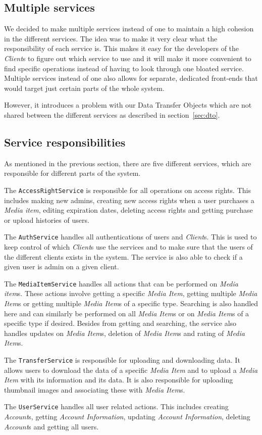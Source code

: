 \documentclass[../report.tex]{subfiles}
\begin{document}
\subsection{Multiple services}
We decided to make multiple services instead of one to maintain a high cohesion in the different services.
The idea was to make it very clear what the responsibility of each service is. 
This makes it easy for the developers of the \textit{Client}s to figure out which service to use and it will make it more convenient to find specific operations instead of having to look through one bloated service.
Multiple services instead of one also allows for separate, dedicated front-ends that would target just certain parts of the whole system. 

However, it introduces a problem with our Data Transfer Objects which are not shared between the different services as described in section~\ref{sec:dto}.

\subsection{Service responsibilities}
As mentioned in the previous section, there are five different services, which are responsible for different parts of the system. 

The \texttt{AccessRightService} is responsible for all operations on access rights. This includes making new admins, creating new access rights when a user purchases a \textit{Media item}, editing expiration dates, deleting access rights and getting purchase or upload histories of users. 

The \texttt{AuthService} handles all authentications of users and \textit{Client}s. This is used to keep control of which \textit{Client}s use the services and to make sure that the users of the different clients exists in the system. The service is also able to check if a given user is admin on a given client.

The \texttt{MediaItemService} handles all actions that can be performed on \textit{Media item}s. These actions involve getting a specific \textit{Media Item}, getting multiple \textit{Media Item}s or getting multiple \textit{Media Item}s of a specific type. Searching is also handled here and can similarly be performed on all \textit{Media Item}s or on \textit{Media Item}s of a specific type if desired. Besides from getting and searching, the service also handles updates on \textit{Media Item}s, deletion of \textit{Media Item}s and rating of \textit{Media Item}s.

The \texttt{TransferService} is responsible for uploading and downloading data. It allows users to download the data of a specific \textit{Media Item} and to upload a \textit{Media Item} with its information and its data. It is also responsible for uploading thumbnail images and associating these with \textit{Media Item}s.

The \texttt{UserService} handles all user related actions. This includes creating \textit{Account}s, getting \textit{Account Information}, updating \textit{Account Information}, deleting \textit{Account}s and getting all users. 
\end{document}

